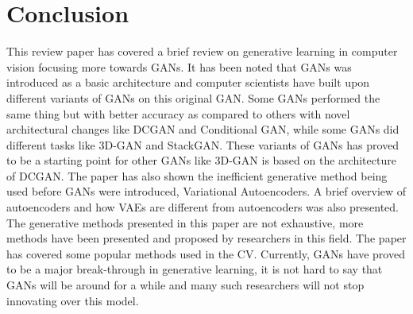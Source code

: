 \documentclass[conference]{IEEEtran}
\begin{document}
\section{Conclusion}
\label{conclusion}
This review paper has covered a brief review on generative learning in computer vision focusing more towards GANs. It has been noted that GANs was introduced as a basic architecture and computer scientists have built upon different variants of GANs on this original GAN. Some GANs performed the same thing but with better accuracy as compared to others with novel architectural changes like DCGAN and Conditional GAN, while some GANs did different tasks like 3D-GAN and StackGAN. These variants of GANs has proved to be a starting point for other GANs like 3D-GAN is based on the architecture of DCGAN. The paper has also shown the inefficient generative method being used before GANs were introduced, Variational Autoencoders. A brief overview of autoencoders and how VAEs are different from autoencoders was also presented. The generative methods presented in this paper are not exhaustive, more methods have been presented and proposed by researchers in this field. The paper has covered some popular methods used in the CV. Currently, GANs have proved to be a major break-through in generative learning, it is not hard to say that GANs will be around for a while and many such researchers will not stop innovating over this model.
\end{document}
